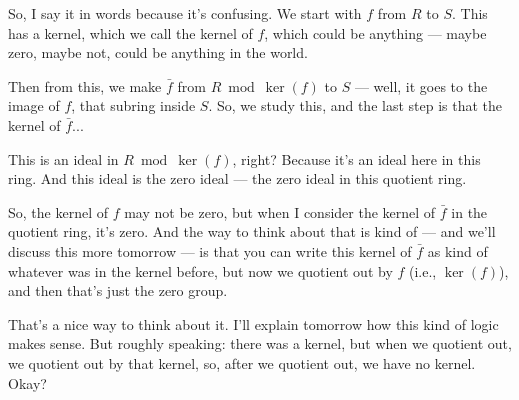\begin{speech}[01:07:47 - 01:09:13]
So, I say it in words because it's confusing. We start with $f$ from $R$ to $S$. This has a kernel, which we call the kernel of $f$,  which could be anything --- maybe zero, maybe not, could be anything in the world. 

Then from this, we make $\bar{f}$ from $R \bmod \ker(f)$ to $S$ --- well, it goes to the image of $f$, that subring inside $S$.  So, we study this, and the last step is that the kernel of $\bar{f}$... 

This is an ideal in $R \bmod \ker(f)$, right?  Because it's an ideal here in this ring. And this ideal is the zero ideal --- the zero ideal in this quotient ring.  

So, the kernel of $f$ may not be zero, but when I consider the kernel of $\bar{f}$ in the quotient ring, it's zero. And the way to think about that is kind of --- and we'll discuss this more tomorrow --- is that you can write this kernel of $\bar{f}$ as kind of whatever was in the kernel before, but now we quotient out by $f$ (i.e., $\ker(f)$), and then that's just the zero group.  

That's a nice way to think about it. I'll explain tomorrow how this kind of logic makes sense. But roughly speaking: there was a kernel, but when we quotient out, we quotient out by that kernel, so, after we quotient out, we have no kernel. Okay?
\end{speech}


